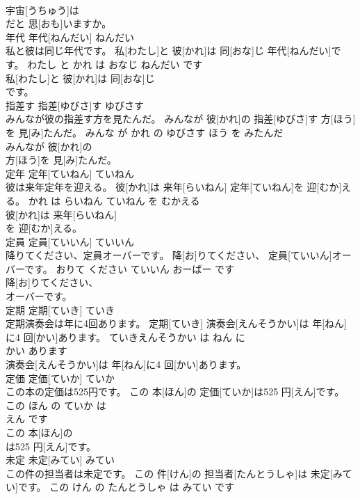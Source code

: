 \documentclass[8pt]{extreport}
\begin{document}
\begin{CJK}{UTF8}{min}
\\	宇宙[うちゅう]は
\\	だと 思[おも]いますか。			
\\	年代	年代[ねんだい]	ねんだい	
\\	私と彼は同じ年代です。	私[わたし]と 彼[かれ]は 同[おな]じ 年代[ねんだい]です。	わたし と かれ は おなじ ねんだい です	
\\	私[わたし]と 彼[かれ]は 同[おな]じ
\\	です。			
\\	指差す	指差[ゆびさ]す	ゆびさす	
\\	みんなが彼の指差す方を見たんだ。	みんなが 彼[かれ]の 指差[ゆびさ]す 方[ほう]を 見[み]たんだ。	みんな が かれ の ゆびさす ほう を みたんだ	
\\	みんなが 彼[かれ]の
\\	方[ほう]を 見[み]たんだ。			
\\	定年	定年[ていねん]	ていねん	
\\	彼は来年定年を迎える。	彼[かれ]は 来年[らいねん] 定年[ていねん]を 迎[むか]える。	かれ は らいねん ていねん を むかえる	
\\	彼[かれ]は 来年[らいねん]
\\	を 迎[むか]える。			
\\	定員	定員[ていいん]	ていいん	
\\	降りてください、定員オーバーです。	降[お]りてください、 定員[ていいん]オーバーです。	おりて ください ていいん おーばー です	
\\	降[お]りてください、
\\	オーバーです。			
\\	定期	定期[ていき]	ていき	
\\	定期演奏会は年に4回あります。	定期[ていき] 演奏会[えんそうかい]は 年[ねん]に4 回[かい]あります。	ていきえんそうかい は ねん に 
\\	かい あります	
\\	演奏会[えんそうかい]は 年[ねん]に4 回[かい]あります。			
\\	定価	定価[ていか]	ていか	
\\	この本の定価は525円です。	この 本[ほん]の 定価[ていか]は525 円[えん]です。	この ほん の ていか は 
\\	えん です	
\\	この 本[ほん]の
\\	は525 円[えん]です。			
\\	未定	未定[みてい]	みてい	
\\	この件の担当者は未定です。	この 件[けん]の 担当者[たんとうしゃ]は 未定[みてい]です。	この けん の たんとうしゃ は みてい です	

\end{CJK}
\end{document}
